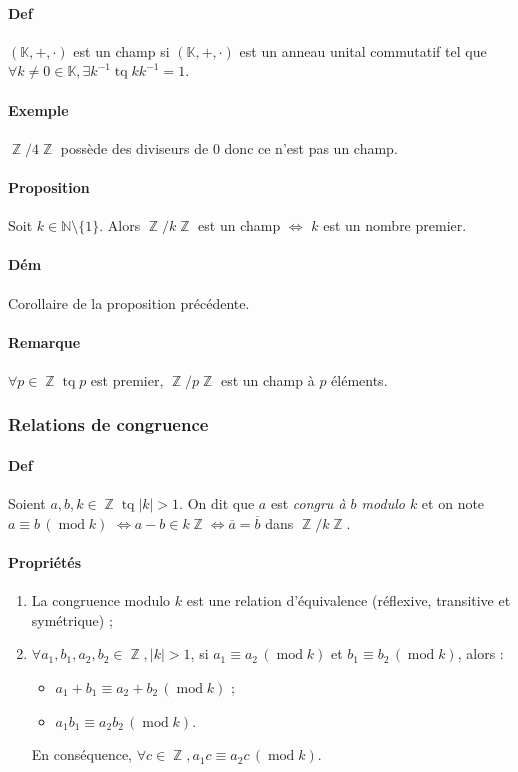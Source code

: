 \documentclass{article}
\DeclareMathOperator{\tq}{\text{ tq }}
\DeclareMathOperator{\Z}{\mathbb Z}
\DeclareMathOperator{\modulo}{mod}
\newcommand{\cmod}[1]{\, (\modulo #1)}
\begin{document}
			\paragraph{Def} $(\mathbb K, +, \cdot)$ est un champ si $(\mathbb K, +,\cdot)$ est un anneau unital commutatif tel que $\forall k \neq 0 \in \mathbb K,
			\exists k^{-1}\tq kk^{-1} = 1$.

			\paragraph{Exemple} $\Z/4\Z$ possède des diviseurs de $0$ donc ce n'est pas un champ.

			\paragraph{Proposition} Soit $k \in \mathbb N \setminus \{1\}$. Alors $\Z/k\Z$ est un champ $\iff$ $k$ est un nombre premier.

			\paragraph{Dém} Corollaire de la proposition précédente.

			\paragraph{Remarque} $\forall p \in \Z \tq p$ est premier, $\Z/p\Z$ est un champ à $p$ éléments.

			\subsubsection{Relations de congruence}

			\paragraph{Def} Soient $a, b, k\in \Z \tq |k| > 1$. On dit que $a$ est \textit{congru à $b$ modulo $k$} et on note $a \equiv b \cmod k$ $\iff a-b \in k\Z \iff
			\overline a = \overline b$ dans $\Z/k\Z$.

			\paragraph{Propriétés}
				\begin{enumerate}
					\item La congruence modulo $k$ est une relation d'équivalence (réflexive, transitive et symétrique) ;
					\item $\forall a_1, b_1, a_2, b_2 \in \Z, |k| > 1$, si $a_1 \equiv a_2 \cmod k$ et $b_1 \equiv b_2 \cmod k$, alors :
						\begin{itemize}
							\item $a_1 + b_1 \equiv a_2 + b_2 \cmod k$ ;
							\item $a_1b_1 \equiv a_2b_2 \cmod k$.
						\end{itemize}
					En conséquence, $\forall c \in \Z, a_1c \equiv a_2c \cmod k$.
				\end{enumerate}
\end{document}
